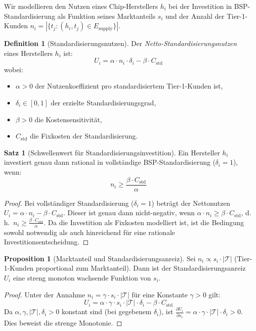 ﻿\documentclass[a4paper,12pt]{article}
\theoremstyle{definition}
\newtheorem{definition}{Definition}
\newtheorem{satz}{Satz}
\newtheorem{proposition}{Proposition}
\begin{document}
Wir modellieren den Nutzen eines Chip-Herstellers $h_i$ bei der Investition
in BSP-Standardisierung als Funktion seines Marktanteils $s_i$
und der Anzahl der Tier-1-Kunden $n_i = |\{t_j : (h_i, t_j) \in E_{\mathrm{supply}}\}|$.

\begin{definition}[Standardisierungsnutzen]
	Der \emph{Netto-Standardisierungsnutzen} eines Herstellers $h_i$ ist:
	\[
	U_i = \alpha \cdot n_i \cdot \delta_i - \beta \cdot C_{\mathrm{std}}
	\]
	wobei:
	\begin{itemize}
		\item $\alpha > 0$ der Nutzenkoeffizient pro standardisiertem Tier-1-Kunden ist,
		\item $\delta_i \in [0,1]$ der erzielte Standardisierungsgrad,
		\item $\beta > 0$ die Kostensensitivität,
		\item $C_{\mathrm{std}}$ die Fixkosten der Standardisierung.
	\end{itemize}
\end{definition}

\begin{satz}[Schwellenwert für Standardisierungsinvestition]
\label{satz:schwelle}
	Ein Hersteller $h_i$ investiert genau dann rational in vollständige BSP-Standardisierung
	($\delta_i = 1$), wenn:
	\[
	n_i \geq \frac{\beta \cdot C_{\mathrm{std}}}{\alpha}
	\]
\end{satz}

\begin{proof}
	Bei vollständiger Standardisierung ($\delta_i = 1$) beträgt der Nettonutzen
	$U_i = \alpha \cdot n_i - \beta \cdot C_{\mathrm{std}}$.
	Dieser ist genau dann nicht-negativ, wenn
	$\alpha \cdot n_i \geq \beta \cdot C_{\mathrm{std}}$,
	d.\,h.\ $n_i \geq \frac{\beta \cdot C_{\mathrm{std}}}{\alpha}$.
	Da die Investition als Fixkosten modelliert ist, ist die Bedingung sowohl
	notwendig als auch hinreichend für eine rationale Investitionsentscheidung.
\end{proof}

\begin{proposition}[Marktanteil und Standardisierungsanreiz]
\label{prop:markt_std}
	Sei $n_i \propto s_i \cdot |\mathcal{T}|$ (Tier-1-Kunden proportional zum Marktanteil).
	Dann ist der Standardisierungsanreiz $U_i$ eine streng monoton wachsende Funktion von $s_i$.
\end{proposition}

\begin{proof}
	Unter der Annahme $n_i = \gamma \cdot s_i \cdot |\mathcal{T}|$ für eine Konstante $\gamma > 0$ gilt:
	\[
	U_i = \alpha \cdot \gamma \cdot s_i \cdot |\mathcal{T}| \cdot \delta_i - \beta \cdot C_{\mathrm{std}}
	\]
	Da $\alpha, \gamma, |\mathcal{T}|, \delta_i > 0$ konstant sind (bei gegebenem $\delta_i$),
	ist $\frac{\partial U_i}{\partial s_i} = \alpha \cdot \gamma \cdot |\mathcal{T}| \cdot \delta_i > 0$.
	Dies beweist die strenge Monotonie.
\end{proof}
\end{document}
